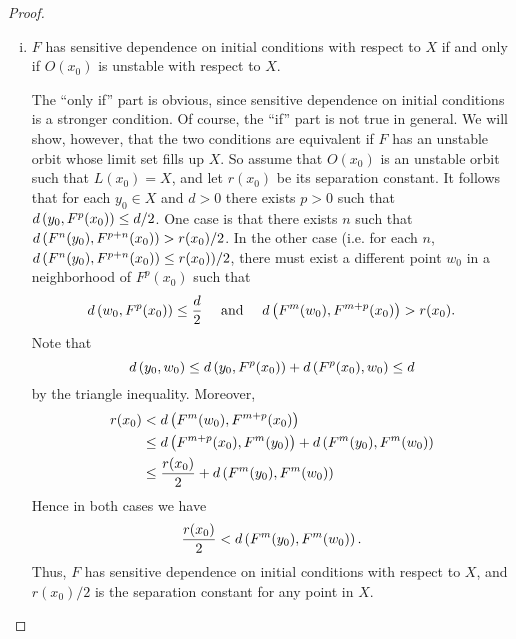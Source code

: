 \documentclass[12pt,draft,twoside]{book}
\begin{document}
\begin{theorem}
\begin{proof}
\begin{enumerate}[(i)]
    \item $F$ has sensitive dependence on initial conditions with respect to $X$ if and only if $O(x_0)$ is unstable with respect to $X$.

      The ``only if'' part is obvious, since sensitive dependence on initial conditions is a stronger condition.
      Of course, the ``if'' part is not true in general. We will show, however, 
      that the two conditions are equivalent if $F$ has an unstable orbit
      whose limit set fills up $X$.
      So assume that $O(x_0)$ is an unstable orbit such that $L(x_0) = X$,
      and let $r(x_0)$ be its separation constant.
      It follows that for each $y_0\in X$ and $d > 0$ there exists $p>0$ such that $d\left( y_0, F^p(x_0) \right) \leq d/2$.
      One case is that there exists $n$ such that $d\left( F^n(y_0), F^{p+n}(x_0) \right) > r(x_0)/2$.
      In the other case (i.e. for each $n$, $d\left( F^n(y_0), F^{p+n}(x_0) \right) \leq r(x_0))/2$,
      there must exist a different point $w_0$ in a neighborhood of $F^p(x_0)$ such that 
      \begin{equation*}
        d\left( w_0, F^p(x_0) \right) \leq \frac{d}{2} \quad \mbox{ and } \quad d\left( F^m(w_0), F^{m+p}(x_0) \right) > r(x_0).
      \end{equation*}
      Note that
      \begin{equation*}
        d\left( y_0, w_0 \right) \leq d\left( y_0, F^p(x_0) \right) + d\left( F^p(x_0), w_0 \right) \leq d
      \end{equation*}
      by the triangle inequality.
      Moreover,
      \begin{align*}
        r(x_0) &< d\left( F^m(w_0), F^{m+p}(x_0) \right) \\
        &\leq d\left( F^{m+p}(x_0), F^m(y_0) \right) + d\left( F^m(y_0), F^m(w_0) \right)  \\
        &\leq \frac{r(x_0)}{2} + d\left( F^m(y_0), F^m(w_0) \right)
      \end{align*}
      Hence in both cases we have
      \begin{equation*}
        \frac{r(x_0)}{2} < d\left( F^m(y_0), F^m(w_0) \right).
      \end{equation*}
      Thus, $F$ has sensitive dependence on initial conditions with respect to $X$, and 
      $r(x_0)/2$ is the separation constant for any point in $X$.
  \end{enumerate}
\end{proof}
\end{theorem}





\printindex
\end{document}
